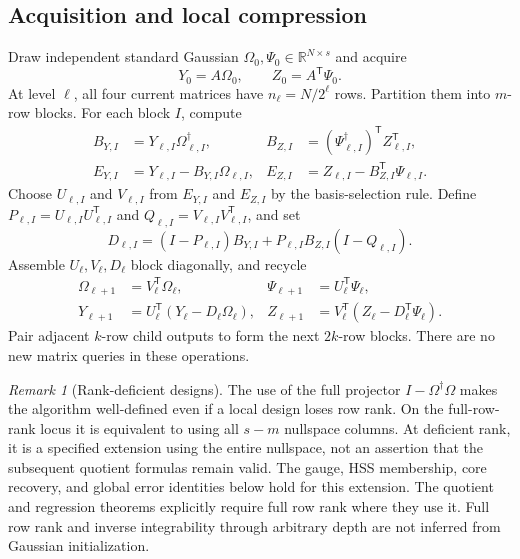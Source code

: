 \documentclass[11pt,oneside,openany,a4paper]{book}
\numberwithin{equation}{chapter}
\theoremstyle{definition}
\theoremstyle{remark}
\newtheorem{remark}[theorem]{Remark}
\newcommand{\R}{\mathbb R}\newcommand{\E}{\mathbb E}\newcommand{\Prb}{\mathbb P}\newcommand{\PP}{\mathbb P}
\newcommand{\T}{\mathsf T}\newcommand{\Id}{I}
\begin{document}
\subsection{Acquisition and local compression}
Draw independent standard Gaussian $\Omega_0,\Psi_0\in\R^{N\times s}$ and
acquire
\begin{equation}\label{base:eq:acquisition}
 Y_0=A\Omega_0,\qquad Z_0=A^{\T}\Psi_0.
\end{equation}
At level $\ell$, all four current matrices have $n_\ell=N/2^\ell$ rows.
Partition them into $m$-row blocks. For each block $I$, compute
\begin{align}
 B_{Y,I}&=Y_{\ell,I}\Omega_{\ell,I}^{\dagger},&
 B_{Z,I}&=(\Psi_{\ell,I}^{\dagger})^{\T} Z_{\ell,I}^{\T},
                                                        \label{base:eq:local-regressions}\\
 E_{Y,I}&=Y_{\ell,I}-B_{Y,I}\Omega_{\ell,I},&
 E_{Z,I}&=Z_{\ell,I}-B_{Z,I}^{\T}\Psi_{\ell,I}.\label{base:eq:local-innovations}
\end{align}
Choose $U_{\ell,I}$ and $V_{\ell,I}$ from $E_{Y,I}$ and $E_{Z,I}$ by the
basis-selection rule. Define $P_{\ell,I}=U_{\ell,I}U_{\ell,I}^{\T}$ and
$Q_{\ell,I}=V_{\ell,I}V_{\ell,I}^{\T}$, and set
\begin{equation}\label{base:eq:local-D}
 D_{\ell,I}=(I-P_{\ell,I})B_{Y,I}
              +P_{\ell,I}B_{Z,I}(I-Q_{\ell,I}).
\end{equation}
Assemble $U_\ell,V_\ell,D_\ell$ block diagonally, and recycle
\begin{align}
 \Omega_{\ell+1}&=V_\ell^{\T}\Omega_\ell,&
 \Psi_{\ell+1}&=U_\ell^{\T}\Psi_\ell,\label{base:eq:test-recycle}\\
 Y_{\ell+1}&=U_\ell^{\T}(Y_\ell-D_\ell\Omega_\ell),&
 Z_{\ell+1}&=V_\ell^{\T}(Z_\ell-D_\ell^{\T}\Psi_\ell).
                                                   \label{base:eq:data-recycle}
\end{align}
Pair adjacent $k$-row child outputs to form the next $2k$-row blocks.
There are no new matrix queries in these operations.

\begin{remark}[Rank-deficient designs]
The use of the full projector $I-\Omega^\dagger\Omega$ makes the algorithm
well-defined even if a local design loses row rank. On the full-row-rank
locus it is equivalent to using all $s-m$ nullspace columns. At deficient
rank, it is a specified extension using the entire nullspace, not an
assertion that the subsequent quotient formulas remain valid. The gauge,
HSS membership, core recovery, and global error identities below hold for
this extension. The quotient and regression theorems explicitly require
full row rank where they use it. Full row rank and inverse integrability
through arbitrary depth are not inferred from Gaussian initialization.
\end{remark}
\end{document}
